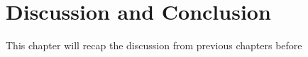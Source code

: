 \chapter{Discussion and Conclusion} \label{sec:discussion_and_conclusion}
    \newpage
    
        This chapter will recap the discussion from previous chapters before 
